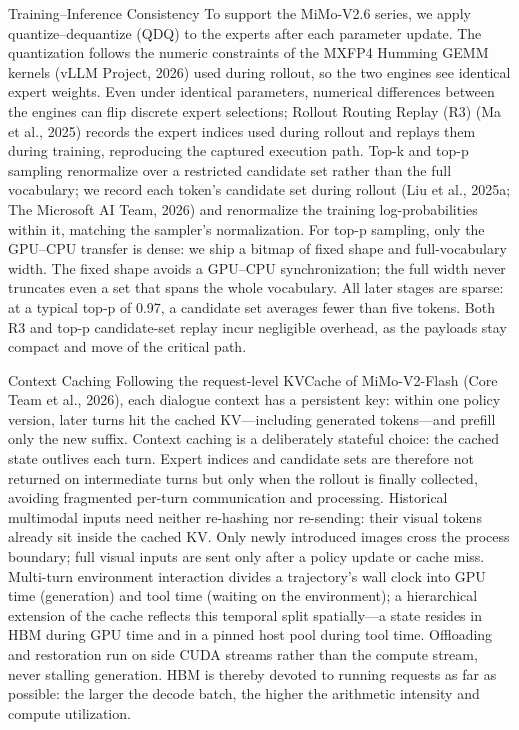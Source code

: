 \documentclass[
  10
]{article}
\begin{document}
Training--Inference Consistency To support the MiMo-V2.6 series, we
apply quantize--dequantize (QDQ) to the experts after each parameter
update. The quantization follows the numeric constraints of the MXFP4
Humming GEMM kernels (vLLM Project, 2026) used during rollout, so the
two engines see identical expert weights. Even under identical
parameters, numerical differences between the engines can flip discrete
expert selections; Rollout Routing Replay (R3) (Ma et al., 2025) records
the expert indices used during rollout and replays them during training,
reproducing the captured execution path. Top-k and top-p sampling
renormalize over a restricted candidate set rather than the full
vocabulary; we record each token's candidate set during rollout (Liu et
al., 2025a; The Microsoft AI Team, 2026) and renormalize the training
log-probabilities within it, matching the sampler's normalization. For
top-p sampling, only the GPU--CPU transfer is dense: we ship a bitmap of
fixed shape and full-vocabulary width. The fixed shape avoids a GPU--CPU
synchronization; the full width never truncates even a set that spans
the whole vocabulary. All later stages are sparse: at a typical top-p of
0.97, a candidate set averages fewer than five tokens. Both R3 and top-p
candidate-set replay incur negligible overhead, as the payloads stay
compact and move of the critical path.

Context Caching Following the request-level KVCache of MiMo-V2-Flash
(Core Team et al., 2026), each dialogue context has a persistent key:
within one policy version, later turns hit the cached KV---including
generated tokens---and prefill only the new suffix. Context caching is a
deliberately stateful choice: the cached state outlives each turn.
Expert indices and candidate sets are therefore not returned on
intermediate turns but only when the rollout is finally collected,
avoiding fragmented per-turn communication and processing. Historical
multimodal inputs need neither re-hashing nor re-sending: their visual
tokens already sit inside the cached KV. Only newly introduced images
cross the process boundary; full visual inputs are sent only after a
policy update or cache miss. Multi-turn environment interaction divides
a trajectory's wall clock into GPU time (generation) and tool time
(waiting on the environment); a hierarchical extension of the cache
reflects this temporal split spatially---a state resides in HBM during
GPU time and in a pinned host pool during tool time. Offloading and
restoration run on side CUDA streams rather than the compute stream,
never stalling generation. HBM is thereby devoted to running requests as
far as possible: the larger the decode batch, the higher the arithmetic
intensity and compute utilization.
\end{document}
